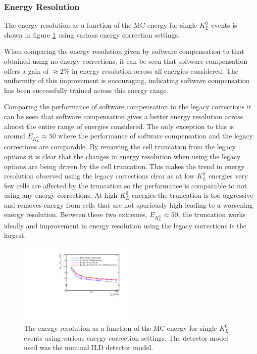\subsubsection{Energy Resolution}
\label{sec:softcomper}
The energy resolution as a function of the MC energy for single $K^{0}_{L}$ events is shown in figure \ref{fig:ersoftcomp} using various energy correction settings.  

When comparing the energy resolution given by software compensation to that obtained using no energy corrections, it can be seen that software compensation offers a gain of $\approx 2 \%$ in energy resolution across all energies considered.  The uniformity of this improvement is encouraging, indicating software compensation has been successfully trained across this energy range.   

Comparing the performance of software compensation to the legacy corrections it can be seen that software compensation gives a better energy resolution across almost the entire range of energies considered.  The only exception to this is around $E_{K^{0}_{L}} \approx 50$ where the performance of software compensation and the legacy corrections are comparable.  By removing the cell truncation from the legacy options it is clear that the changes in energy resolution when using the legacy options are being driven by the cell truncation.  This makes the trend in energy resolution observed using the legacy corrections clear as at low $K^{0}_{L}$ energies very few cells are affected by the truncation so the performance is comparable to not using any energy corrections.  At high $K^{0}_{L}$ energies the truncation is too aggressive and removes energy from cells that are not spuriously high leading to a worsening energy resolution.  Between these two extremes, $E_{K^{0}_{L}} \approx 50$, the truncation works ideally and improvement in energy resolution using the legacy corrections is the largest.  

\begin{figure}
\includegraphics[width=0.5\textwidth]{EnergyEstimators/Plots/SoftComp/EnergyResolution/ER_vs_Kaon0LSoftComp_Kaon0L.pdf}
\caption[The energy resolution as a function of the MC energy for single $K^{0}_{L}$ events using various energy correction settings.  The detector model used was the nominal ILD detector model.]{The energy resolution as a function of the MC energy for single $K^{0}_{L}$ events using various energy correction settings.  The detector model used was the nominal ILD detector model.}
\label{fig:ersoftcomp}
\end{figure}

